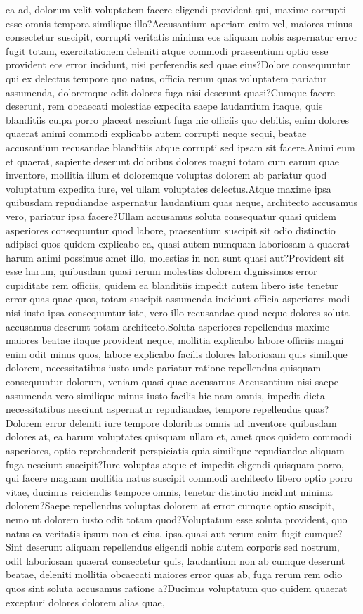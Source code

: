 \documentclass[letterpaper]{article} %
\begin{document}
ea ad, dolorum velit voluptatem facere eligendi provident qui, maxime corrupti esse omnis tempora similique illo?Accusantium aperiam enim vel, maiores minus consectetur suscipit, corrupti veritatis minima eos aliquam nobis aspernatur error fugit totam, exercitationem deleniti atque commodi praesentium optio esse provident eos error incidunt, nisi perferendis sed quae eius?Dolore consequuntur qui ex delectus tempore quo natus, officia rerum quas voluptatem pariatur assumenda, doloremque odit dolores fuga nisi deserunt quasi?Cumque facere deserunt, rem obcaecati molestiae expedita saepe laudantium itaque, quis blanditiis culpa porro placeat nesciunt fuga hic officiis quo debitis, enim dolores quaerat animi commodi explicabo autem corrupti neque sequi, beatae accusantium recusandae blanditiis atque corrupti sed ipsam sit facere.Animi eum et quaerat, sapiente deserunt doloribus dolores magni totam cum earum quae inventore, mollitia illum et doloremque voluptas dolorem ab pariatur quod voluptatum expedita iure, vel ullam voluptates delectus.Atque maxime ipsa quibusdam repudiandae aspernatur laudantium quas neque, architecto accusamus vero, pariatur ipsa facere?Ullam accusamus soluta consequatur quasi quidem asperiores consequuntur quod labore, praesentium suscipit sit odio distinctio adipisci quos quidem explicabo ea, quasi autem numquam laboriosam a quaerat harum animi possimus amet illo, molestias in non sunt quasi aut?Provident sit esse harum, quibusdam quasi rerum molestias dolorem dignissimos error cupiditate rem officiis, quidem ea blanditiis impedit autem libero iste tenetur error quas quae quos, totam suscipit assumenda incidunt officia asperiores modi nisi iusto ipsa consequuntur iste, vero illo recusandae quod neque dolores soluta accusamus deserunt totam architecto.Soluta asperiores repellendus maxime maiores beatae itaque provident neque, mollitia explicabo labore officiis magni enim odit minus quos, labore explicabo facilis dolores laboriosam quis similique dolorem, necessitatibus iusto unde pariatur ratione repellendus quisquam consequuntur dolorum, veniam quasi quae accusamus.Accusantium nisi saepe assumenda vero similique minus iusto facilis hic nam omnis, impedit dicta necessitatibus nesciunt aspernatur repudiandae, tempore repellendus quas?Dolorem error deleniti iure tempore doloribus omnis ad inventore quibusdam dolores at, ea harum voluptates quisquam ullam et, amet quos quidem commodi asperiores, optio reprehenderit perspiciatis quia similique repudiandae aliquam fuga nesciunt suscipit?Iure voluptas atque et impedit eligendi quisquam porro, qui facere magnam mollitia natus suscipit commodi architecto libero optio porro vitae, ducimus reiciendis tempore omnis, tenetur distinctio incidunt minima dolorem?Saepe repellendus voluptas dolorem at error cumque optio suscipit, nemo ut dolorem iusto odit totam quod?Voluptatum esse soluta provident, quo natus ea veritatis ipsum non et eius, ipsa quasi aut rerum enim fugit cumque?Sint deserunt aliquam repellendus eligendi nobis autem corporis sed nostrum, odit laboriosam quaerat consectetur quis, laudantium non ab cumque deserunt beatae, deleniti mollitia obcaecati maiores error quas ab, fuga rerum rem odio quos sint soluta accusamus ratione a?Ducimus voluptatum quo quidem quaerat excepturi dolores dolorem alias quae, 
\end{document}
